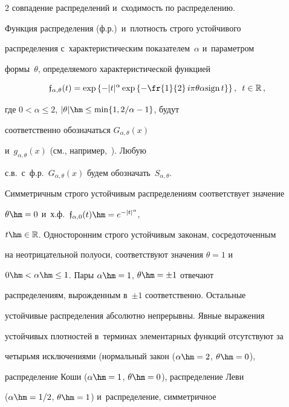 \begin{multicols}{2}
совпадение распределений и~сходимость по распределению.





Функция распределения (ф.р.)\ и~плотность строго устойчивого


распределения с~характеристическим показателем~$\alpha$ и~параметром


формы~$\theta$, определяемого характеристической функцией


$$


\mathfrak{f}_{\alpha,\theta}(t)=


\exp\left\{-|t|^{\alpha}\exp


\left\{-\fr{1}{2}\,i\pi\theta\alpha\mathrm{sign}\,t\right\}\right\},\enskip


t\in\mathbb{R}\,,


$$


где $0<\alpha\le2$, $|\theta|\hm\le\min\{1,{2}/{\alpha}-1\}$, будут


соответственно обозначаться $G_{\alpha,\theta}(x)$ 


и~$g_{\alpha,\theta}(x)$ (см., например,~\cite{Zolotarev1983-k}). Любую


с.в.\ с~ф.р.~$G_{\alpha,\theta}(x)$ будем обозначать~$S_{\alpha,\theta}$.





Симметричным строго устойчивым распределениям соответствует значение


$\theta\hm=0$ и~х.ф.~$\mathfrak{f}_{\alpha,0}(t)\hm=e^{-|t|^{\alpha}}$,


$t\hm\in\mathbb{R}$. Односторонним строго устойчивым законам, сосредоточенным


на неотрицательной полуоси, соответствуют значения $\theta=1$ и


$0\hm<\alpha\hm\le1$. Пары $\alpha\hm=1$, $\theta\hm=\pm1$ отвечают


распределениям, вырожденным в~$\pm1$ соответственно. Остальные


устойчивые распределения абсолютно непрерывны. Явные выражения


устойчивых плотностей в~терминах элементарных функций отсутствуют за


четырьмя исключениями (нормальный закон ($\alpha\hm=2$, $\theta\hm=0$),


распределение Коши ($\alpha\hm=1$, $\theta\hm=0$), распределение Леви


($\alpha\hm=1/2$, $\theta\hm=1$) и~распределение, симметричное 



\end{multicols}

